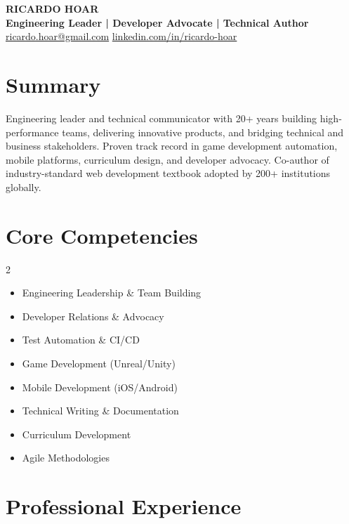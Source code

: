 \documentclass[11pt]{article}
\newcommand{\contact}[2]{
  \faIcon{at} \href{mailto:#1}{#1} \hfill
  \faIcon{linkedin} \href{https://linkedin.com/in/#2}{linkedin.com/in/#2}
}
\newcommand{\tech}[1]{\textcolor{secondary}{\textbf{#1}}}
\begin{document}
\begin{center}
    {\Huge \textbf{RICARDO HOAR}} \\[4pt]
    {\Large \tech{Engineering Leader | Developer Advocate | Technical Author}} \\[6pt]
\contact{ricardo.hoar@gmail.com}{ricardo-hoar}
\end{center}

\section*{Summary}
Engineering leader and technical communicator with 20+ years building high-performance teams, delivering innovative products, and bridging technical and business stakeholders. Proven track record in game development automation, mobile platforms, curriculum design, and developer advocacy. Co-author of industry-standard web development textbook adopted by 200+ institutions globally.

\section*{Core Competencies}
\begin{multicols}{2}
\begin{itemize}
    \item Engineering Leadership \& Team Building
    \item Developer Relations \& Advocacy
    \item Test Automation \& CI/CD
    \item Game Development (Unreal/Unity)
    \item Mobile Development (iOS/Android)
    \item Technical Writing \& Documentation
    \item Curriculum Development
    \item Agile Methodologies
\end{itemize}
\end{multicols}

\section*{Professional Experience}
\end{document}
